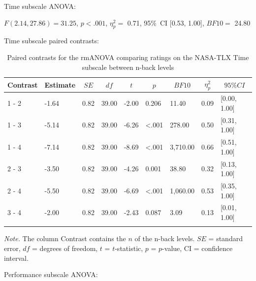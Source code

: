 \documentclass[
  man,floatsintext]{apa6}
\begin{document}
Time subscale ANOVA:

\(F(2.14, 27.86) = 31.25\), \(p < .001\), \(\eta_{p}^{2}=\) 0.71, 95\%~CI {[}0.53, 1.00{]}, \(BF10=\) 24.80

Time subscale paired contrasts:

\begin{table}[H]

\begin{center}
\begin{threeparttable}

\caption{\label{tab:unnamed-chunk-4}Paired contrasts for the rmANOVA comparing ratings on the NASA-TLX Time subscale between n-back levels}

\begin{tabular}{lllllllll}
\toprule
Contrast & \multicolumn{1}{c}{Estimate} & \multicolumn{1}{c}{$SE$} & \multicolumn{1}{c}{$df$} & \multicolumn{1}{c}{$t$} & \multicolumn{1}{c}{$p$} & \multicolumn{1}{c}{$BF10$} & \multicolumn{1}{c}{$\eta_{p}^{2}$} & \multicolumn{1}{c}{$95\% CI$}\\
\midrule
1 - 2 & -1.64 & 0.82 & 39.00 & -2.00 & 0.206 & 11.40 & 0.09 & {}[0.00, 1.00]\\
1 - 3 & -5.14 & 0.82 & 39.00 & -6.26 & <.001 & 278.00 & 0.50 & {}[0.31, 1.00]\\
1 - 4 & -7.14 & 0.82 & 39.00 & -8.69 & <.001 & 3,710.00 & 0.66 & {}[0.51, 1.00]\\
2 - 3 & -3.50 & 0.82 & 39.00 & -4.26 & 0.001 & 38.80 & 0.32 & {}[0.13, 1.00]\\
2 - 4 & -5.50 & 0.82 & 39.00 & -6.69 & <.001 & 1,060.00 & 0.53 & {}[0.35, 1.00]\\
3 - 4 & -2.00 & 0.82 & 39.00 & -2.43 & 0.087 & 3.09 & 0.13 & {}[0.01, 1.00]\\
\bottomrule
\addlinespace
\end{tabular}

\begin{tablenotes}[para]
\normalsize{\textit{Note.} The column Contrast contains the $n$ of the n-back levels. $SE$ = standard error, $df$ = degrees of freedom, $t$ = $t$-statistic, $p$ = $p$-value, CI = confidence interval.}
\end{tablenotes}

\end{threeparttable}
\end{center}

\end{table}

\newpage

Performance subscale ANOVA:
\end{document}
